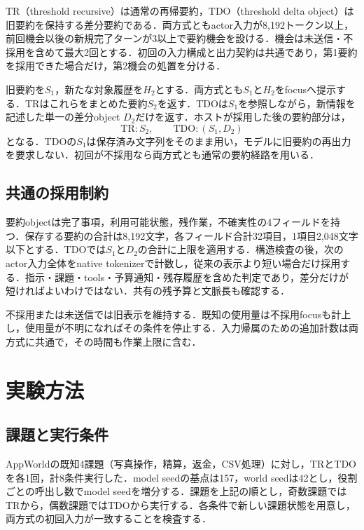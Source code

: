 \documentclass[letter]{ieicej}
\begin{document}
TR（threshold recursive）は通常の再帰要約，TDO（threshold delta object）は旧要約を保持する差分要約である．両方式ともactor入力が8,192トークン以上，前回機会以後の新規完了ターンが3以上で要約機会を設ける．機会は未送信・不採用を含めて最大2回とする．初回の入力構成と出力契約は共通であり，第1要約を採用できた場合だけ，第2機会の処置を分ける．

旧要約を$S_1$，新たな対象履歴を$H_2$とする．両方式とも$S_1$と$H_2$をfocusへ提示する．TRはこれらをまとめた要約$S_2$を返す．TDOは$S_1$を参照しながら，新情報を記述した単一の差分object $D_2$だけを返す．ホストが採用した後の要約部分は，
\begin{equation}
 \text{TR}: S_2,\qquad \text{TDO}: (S_1,D_2)
 \label{eq:representation}
\end{equation}
となる．TDOの$S_1$は保存済み文字列をそのまま用い，モデルに旧要約の再出力を要求しない．初回が不採用なら両方式とも通常の要約経路を用いる．

\subsection{共通の採用制約}
要約objectは完了事項，利用可能状態，残作業，不確実性の4フィールドを持つ．保存する要約の合計は8,192文字，各フィールド合計32項目，1項目2,048文字以下とする．TDOでは$S_1$と$D_2$の合計に上限を適用する．構造検査の後，次のactor入力全体をnative tokenizerで計数し，従来の表示より短い場合だけ採用する．指示・課題・tools・予算通知・残存履歴を含めた判定であり，差分だけが短ければよいわけではない．共有の残予算と文脈長も確認する．

不採用または未送信では旧表示を維持する．既知の使用量は不採用focusも計上し，使用量が不明になればその条件を停止する．入力帰属のための追加計数\cite{singh2026tca}は両方式に共通で，その時間も作業上限に含む．

\section{実験方法}
\subsection{課題と実行条件}
AppWorld\cite{trivedi2024appworld}の既知4課題（写真操作，精算，返金，CSV処理）に対し，TRとTDOを各1回，計8条件実行した．model seedの基点は157，world seedは42とし，役割ごとの呼出し数でmodel seedを増分する．課題を上記の順とし，奇数課題ではTRから，偶数課題ではTDOから実行する．各条件で新しい課題状態を用意し，両方式の初回入力が一致することを検査する．
\end{document}
